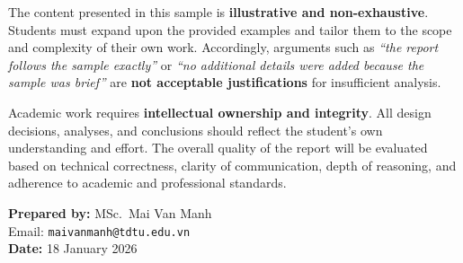 \vspace{0.6em}

The content presented in this sample is \textbf{illustrative and non-exhaustive}. Students must expand upon the provided examples and tailor them to the scope and complexity of their own work. Accordingly, arguments such as \emph{“the report follows the sample exactly”} or \emph{“no additional details were added because the sample was brief”} are \textbf{not acceptable justifications} for insufficient analysis.

\vspace{0.6em}

Academic work requires \textbf{intellectual ownership and integrity}. All design decisions, analyses, and conclusions should reflect the student’s own understanding and effort. The overall quality of the report will be evaluated based on technical correctness, clarity of communication, depth of reasoning, and adherence to academic and professional standards.

\vspace{1.2em}
\noindent
\textbf{Prepared by:} MSc.\ Mai Van Manh\\
Email: \texttt{maivanmanh@tdtu.edu.vn}\\
\textbf{Date:} 18 January 2026
